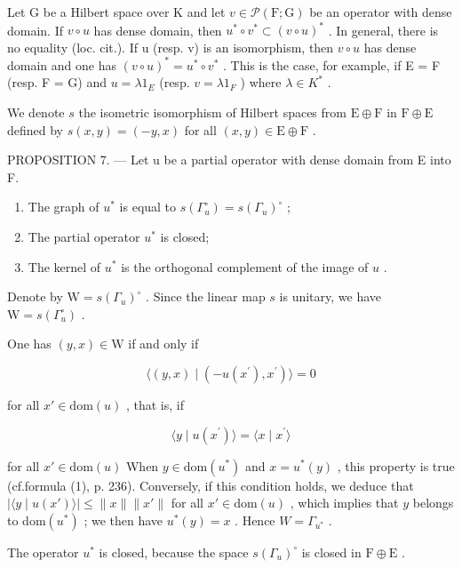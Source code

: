Let G be a Hilbert space over K and let \(v \in \mathcal{P}(\mathrm{F};\mathrm{G})\) be an operator with dense domain. If \(v \circ u\) has dense domain, then \(u^{*} \circ v^{*} \subset (v \circ u)^{*}\) . In general, there is no equality (loc. cit.). If u (resp. v) is an isomorphism, then \(v \circ u\) has dense domain and one has \((v \circ u)^{*} = u^{*} \circ v^{*}\) . This is the case, for example, if E = F (resp. F = G) and \(u = \lambda 1_{E}\) (resp. \(v = \lambda 1_{F}\) ) where \(\lambda \in K^{*}\) .

We denote \(s\) the isometric isomorphism of Hilbert spaces from \(\mathrm{E} \oplus \mathrm{F}\) in \(\mathrm{F} \oplus \mathrm{E}\) defined by \(s(x, y) = (-y, x)\) for all \((x, y) \in \mathrm{E} \oplus \mathrm{F}\) .

PROPOSITION 7. --- Let u be a partial operator with dense domain from E into F.

\begin{enumerate}
\def\labelenumi{\alph{enumi})}
\item
  The graph of \(u^{*}\) is equal to \(s(\Gamma_{u}^{\circ}) = s(\Gamma_{u})^{\circ}\) ;
\item
  The partial operator \(u^{*}\) is closed;
\item
  The kernel of \(u^{*}\) is the orthogonal complement of the image of \(u\) .
\end{enumerate}

Denote by \(\mathrm{W} = s(\Gamma_u)^\circ\) . Since the linear map \(s\) is unitary, we have \(\mathrm{W} = s(\Gamma_u^\circ)\) .

One has \((y,x)\in \mathrm{W}\) if and only if

\[
\langle (y, x) \mid (- u (x ^ {\prime}), x ^ {\prime}) \rangle = 0
\]

for all \(x' \in \mathrm{dom}(u)\) , that is, if

\[
\langle y \mid u (x ^ {\prime}) \rangle = \langle x \mid x ^ {\prime} \rangle
\]

for all \(x' \in \text{dom}(u)\) When \(y \in \text{dom}(u^{*})\) and \(x = u^{*}(y)\) , this property is true (cf.formula (1), p. 236). Conversely, if this condition holds, we deduce that \(|\langle y \mid u(x') \rangle| \leqslant \|x\| \|x'\|\) for all \(x' \in \text{dom}(u)\) , which implies that \(y\) belongs to \(\text{dom}(u^*)\) ; we then have \(u^*(y) = x\) . Hence \(W = \Gamma_{u^*}\) .

The operator \(u^{*}\) is closed, because the space \(s(\Gamma_{u})^{\circ}\) is closed in \(\mathrm{F} \oplus \mathrm{E}\) .

